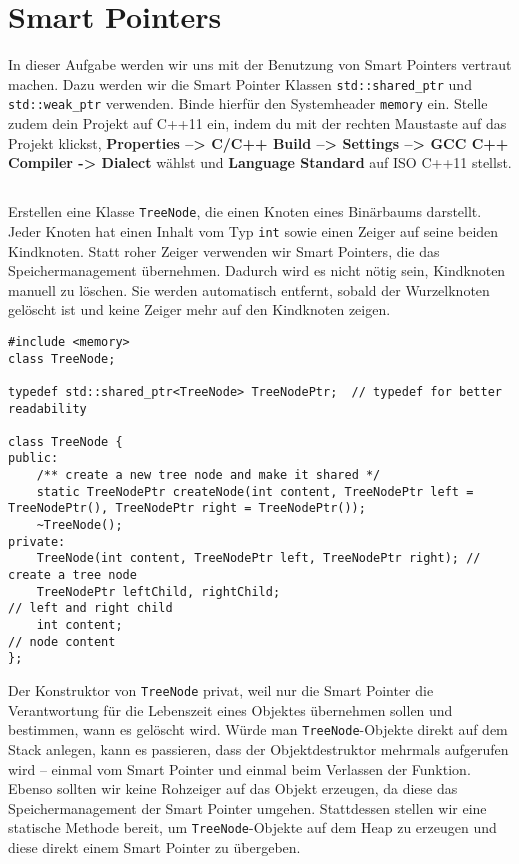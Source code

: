 \section{Smart Pointers}
In dieser Aufgabe werden wir uns mit der Benutzung von Smart Pointers vertraut machen. Dazu werden wir die Smart Pointer Klassen \texttt{std::shared\_ptr} und \texttt{std::weak\_ptr} verwenden. Binde hierfür den Systemheader \texttt{memory} ein.
Stelle zudem dein Projekt auf C++11 ein, indem du mit der rechten Maustaste auf das Projekt klickst, \textbf{Properties --> C/C++ Build --> Settings --> GCC C++ Compiler -> Dialect} wählst und \textbf{Language Standard} auf ISO C++11 stellst.

\subsection{}
Erstellen eine Klasse \texttt{TreeNode}, die einen Knoten eines Binärbaums darstellt.
Jeder Knoten hat einen Inhalt vom Typ \texttt{int} sowie einen Zeiger auf seine beiden Kindknoten.
Statt \glqq roher\grqq{} Zeiger verwenden wir Smart Pointers, die das Speichermanagement übernehmen.
Dadurch wird es nicht nötig sein, Kindknoten manuell zu löschen.
Sie werden automatisch entfernt, sobald der Wurzelknoten gelöscht ist und keine Zeiger mehr auf den Kindknoten zeigen.

\begin{lstlisting}
#include <memory>
class TreeNode;

typedef std::shared_ptr<TreeNode> TreeNodePtr;	// typedef for better readability

class TreeNode {
public:
	/** create a new tree node and make it shared */
	static TreeNodePtr createNode(int content, TreeNodePtr left = TreeNodePtr(), TreeNodePtr right = TreeNodePtr());
	~TreeNode();
private:
	TreeNode(int content, TreeNodePtr left, TreeNodePtr right);	// create a tree node
	TreeNodePtr leftChild, rightChild;									// left and right child
	int content;																// node content
};
\end{lstlisting}

Der Konstruktor von \texttt{TreeNode} privat, weil nur die Smart Pointer die Verantwortung für die Lebenszeit eines Objektes übernehmen sollen und bestimmen, wann es gelöscht wird.
Würde man \texttt{TreeNode}-Objekte direkt auf dem Stack anlegen, kann es passieren, dass der Objektdestruktor mehrmals aufgerufen wird -- einmal vom Smart Pointer und einmal beim Verlassen der Funktion.
Ebenso sollten wir keine Rohzeiger auf das Objekt erzeugen, da diese das Speichermanagement der Smart Pointer umgehen.
Stattdessen stellen wir eine statische Methode bereit, um \texttt{TreeNode}-Objekte auf dem Heap zu erzeugen und diese direkt einem Smart Pointer zu übergeben.

